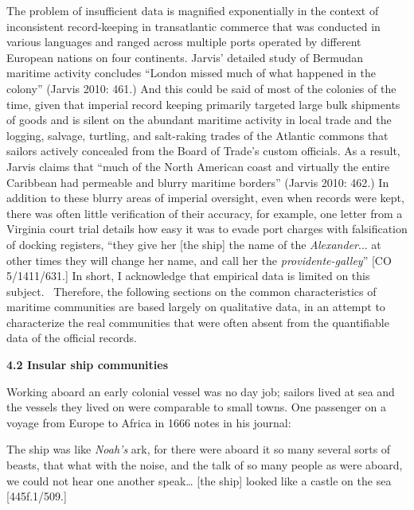 \begin{styleStandard}
The problem of insufficient data is magnified exponentially in the context of inconsistent record-keeping in transatlantic commerce that was conducted in various languages and ranged across multiple ports operated by different European nations on four continents. Jarvis’ detailed study of Bermudan maritime activity concludes “London missed much of what happened in the colony” (Jarvis 2010: 461.) And this could be said of most of the colonies of the time, given that imperial record keeping primarily targeted large bulk shipments of goods and is silent on the abundant maritime activity in local trade and the logging, salvage, turtling, and salt-raking trades of the Atlantic commons that sailors actively concealed from the Board of Trade’s custom officials. As a result, Jarvis claims that “much of the North American coast and virtually the entire Caribbean had permeable and blurry maritime borders” (Jarvis 2010: 462.) In addition to these blurry areas of imperial oversight, even when records were kept, there was often little verification of their accuracy, for example, one letter from a Virginia court trial details how easy it was to evade port charges with falsification of docking registers, “they give her [the ship] the name of the \textit{Alexander}... at other times they will change her name, and call her the \textit{providente-galley}” [CO 5/1411/631.] In short, I acknowledge that empirical data is limited on this subject. \ Therefore, the following sections on the common characteristics of maritime communities are based largely on qualitative data, in an attempt to characterize the real communities that were often absent from the quantifiable data of the official records.
\end{styleStandard}

\begin{styleStandard}
\textbf{4.2 Insular ship communities}
\end{styleStandard}

\begin{styleStandard}
Working aboard an early colonial vessel was no day job; sailors lived at sea and the vessels they lived on were comparable to small towns. One passenger on a voyage from Europe to Africa in 1666 notes in his journal: 
\end{styleStandard}

\begin{styleStandard}
The ship was like \textit{Noah’s} ark, for there were aboard it so many several sorts of beasts, that what with the noise, and the talk of so many people as were aboard, we could not hear one another speak… [the ship] looked like a castle on the sea [445f.1/509.]
\end{styleStandard}

